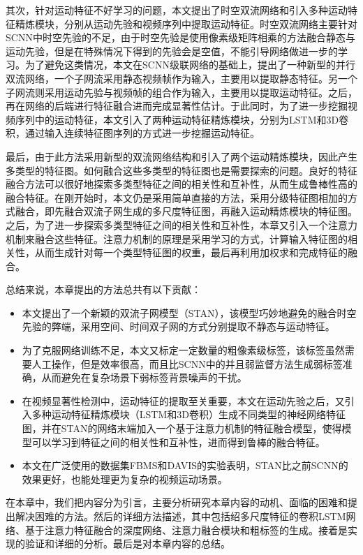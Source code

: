 其次，针对运动特征不好学习的问题，本文提出了时空双流网络和引入多种运动特征精炼模块，分别从运动先验和视频序列中提取运动特征。时空双流网络主要针对SCNN中时空先验的不足，由于时空先验是使用像素级矩阵相乘的方法融合静态与运动先验，但是在特殊情况下得到的先验会是空值，不能引导网络做进一步的学习。为了避免这类情况，本文在SCNN级联网络的基础上，提出了一种新型的并行双流网络，一个子网流采用静态视频帧作为输入，主要用以提取静态特征。另一个子网流则采用运动先验与视频帧的组合作为输入，主要用以提取运动特征。之后，再在网络的后端进行特征融合进而完成显著性估计。于此同时，为了进一步挖掘视频序列中的运动特征，本文引入了两种运动特征精炼模块，分别为LSTM和3D卷积，通过输入连续特征图序列的方式进一步挖掘运动特征。

最后，由于此方法采用新型的双流网络结构和引入了两个运动精炼模块，因此产生多类型的特征图。如何融合这些多类型的特征图也是需要探索的问题。良好的特征融合方法可以很好地探索多类型特征之间的相关性和互补性，从而生成鲁棒性高的融合特征。在刚开始时，本文仍是采用简单直接的方法，采用分级特征图相加的方式融合，即先融合双流子网生成的多尺度特征图，再融入运动精炼模块的特征图。之后，为了进一步探索多类型特征之间的相关性和互补性，本章又引入一个注意力机制来融合这些特征。注意力机制的原理是采用学习的方式，计算输入特征图的相关性，从而生成针对每一个类型特征图的权重，最后再利用加权求和完成特征的融合。

总结来说，本章提出的方法总共有以下贡献：
\begin{itemize}
  \item 本文提出了一个新颖的双流子网模型（STAN），该模型巧妙地避免的融合时空先验的弊端，采用空间、时间双子网的方式分别提取不静态与运动特征。
  \item 为了克服网络训练不足，本文又标定一定数量的粗像素级标签，该标签虽然需要人工操作，但是效率很高，而且比SCNN中的并且弱监督方法生成弱标签准确，从而避免在复杂场景下弱标签背景噪声的干扰。
  \item 在视频显著性检测中，运动特征的提取至关重要，本文在运动先验之后，又引入多种运动特征精炼模块（LSTM和3D卷积）生成不同类型的神经网络特征图，并在STAN的网络末端加入一个基于注意力机制的特征融合模型，使得模型可以学习到特征之间的相关性和互补性，进而得到鲁棒的融合特征。
  \item 本文在广泛使用的数据集FBMS和DAVIS的实验表明，STAN比之前SCNN的效果更好，也能处理更为复杂的视频运动场景。
\end{itemize}

在本章中，我们把内容分为引言，主要分析研究本章内容的动机、面临的困难和提出解决困难的方法。然后的详细方法描述，其中包括绍多尺度特征的卷积LSTM网络、基于注意力特征融合的深度网络、注意力融合模块和粗标签的生成。接着是实现的验证和详细的分析。最后是对本章内容的总结。

